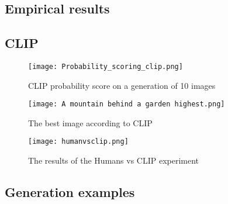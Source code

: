 \documentclass{article}
\begin{document}
\begin{appendix}
\section{Empirical results}

\subsection{CLIP}
\label{app:clip-img}
\begin{figure}[H]
    \centering
    \texttt{[image: Probability\_scoring\_clip.png]}
    \caption{CLIP probability score on a generation of 10 images}
    \label{fig:clip_proba_exemple}
\end{figure}
\begin{figure}[H]
    \centering
    \texttt{[image: A mountain behind a garden highest.png]}
    \caption{The best image according to CLIP}
    \label{fig:clip_image_exemple}
\end{figure}
\begin{figure}[h!]
    \centering
    \texttt{[image: humanvsclip.png]}
    \caption{The results of the Humans vs CLIP experiment}
    \label{fig:Humans vs CLIP}
\end{figure}

\subsection{Generation examples}
\label{app:gen-examples}


\end{appendix}
\end{document}
